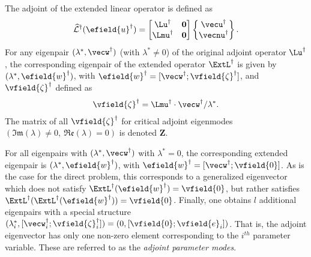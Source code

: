The adjoint of the extended linear operator is defined as 
\begin{eqnarray}
	\mathcal{\widehat{L}}^{\dagger}(\efield{u}^{\dagger}) =
	\begin{bmatrix}
		\Lu^{\dagger} 		& \mathbf{0} \\
		\Lmu^{\dagger}	 & \mathbf{0}
	\end{bmatrix}
	\begin{Bmatrix}
		\vecu^{\dagger} \\
		\vecnu^{\dagger}
	\end{Bmatrix}
\label{eqn:adjoint_operator_extended}.
\end{eqnarray}
For any eigenpair $(\lambda^{*},\vecw^{\dagger})$ (with $\lambda^{*}\ne 0$) of the original adjoint operator $\Lu^{\dagger}$, the corresponding eigenpair of the extended operator $\ExtL^{\dagger}$ is given by $(\lambda^{*}, \efield{w}^{\dagger})$, with $\efield{w}^{\dagger} = [\vecw^{\dagger}; \vfield{\zeta}^{\dagger}]$, and  $\vfield{\zeta}^{\dagger}$ defined as
\begin{eqnarray}
	\label{eqn:extended_adjoint_eigenvector}
	\vfield{\zeta}^{\dagger} = \Lmu^{\dagger}\cdot\vecw^{\dagger}/\lambda^{*}.
\end{eqnarray}
The matrix of all $\vfield{\zeta}^{\dagger}$ for critical  adjoint eigenmodes $(\mathfrak{Im}(\lambda)\ne 0,\ \mathfrak{Re}(\lambda)=0)$ is denoted $\mathbf{Z}$.

For all eigenpairs with $(\lambda^{*},\vecw^{\dagger})$ with $\lambda^{*} = 0$, the corresponding extended eigenpair is $(\lambda^{*},\efield{w}^{\dagger})$, with $\efield{w}^{\dagger} = [\vecw^{\dagger}; \vfield{0}]$. As is the case for the direct problem, this corresponds to a generalized eigenvector which does not satisfy $\ExtL^{\dagger}(\efield{w}^{\dagger}) = \vfield{0}$, but rather satisfies $\ExtL^{\dagger}(\ExtL^{\dagger}(\efield{w}^{\dagger})) = \vfield{0}$. Finally, one obtains $l$ additional eigenpairs with a special structure $(\lambda^{*}_{i},[\vecw^{\dagger}_{i};\vfield{\zeta}^{\dagger}_{i}]) = (0,[\vfield{0};\vfield{e}_{i}])$. That is, the adjoint eigenvector has only one non-zero element corresponding to the $i^{th}$ parameter variable. These are referred to as the \emph{adjoint parameter modes}.

